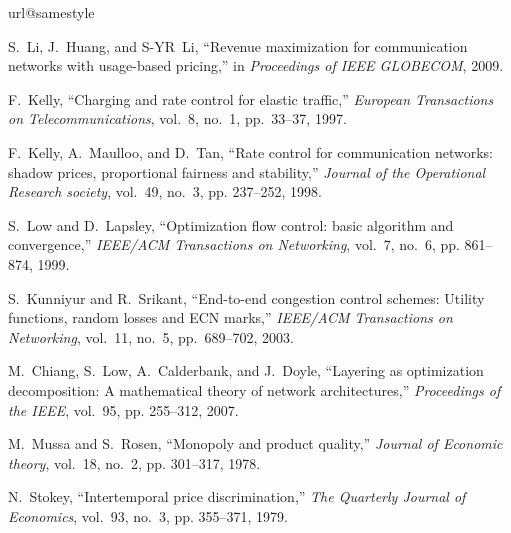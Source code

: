 \documentclass[twocolumn,10pt,twosided]{IEEEtran}
\begin{document}
\begin{thebibliography}{10}
\providecommand{\url}[1]{#1}
\csname url@samestyle\endcsname
\providecommand{\newblock}{\relax}
\providecommand{\bibinfo}[2]{#2}
\providecommand{\BIBentrySTDinterwordspacing}{\spaceskip=0pt\relax}
\providecommand{\BIBentryALTinterwordstretchfactor}{4}
\providecommand{\BIBentryALTinterwordspacing}{\spaceskip=\fontdimen2\font plus
\BIBentryALTinterwordstretchfactor\fontdimen3\font minus
  \fontdimen4\font\relax}
\providecommand{\BIBforeignlanguage}[2]{{\expandafter\ifx\csname l@#1\endcsname\relax
\typeout{** WARNING: IEEEtran.bst: No hyphenation pattern has been}\typeout{** loaded for the language `#1'. Using the pattern for}\typeout{** the default language instead.}\else
\language=\csname l@#1\endcsname
\fi
#2}}
\providecommand{\BIBdecl}{\relax}
\BIBdecl

S.~Li, J.~Huang, and S-YR~Li, 
``{Revenue maximization for communication networks with usage-based pricing},''
in \emph{Proceedings of  IEEE GLOBECOM}, 2009.

F.~Kelly, ``{Charging and rate control for elastic traffic},'' \emph{European
  Transactions on Telecommunications}, vol.~8, no.~1, pp.~33--37, 1997.

F.~Kelly, A.~Maulloo, and D.~Tan, ``{Rate control for communication networks:
  shadow prices, proportional fairness and stability},'' \emph{Journal of the
  Operational Research society}, vol.~49, no.~3, pp. 237--252, 1998.

S.~Low and D.~Lapsley, ``{Optimization flow control: basic algorithm and
  convergence},'' \emph{IEEE/ACM Transactions on Networking}, vol.~7,
  no.~6, pp. 861--874, 1999.

S.~Kunniyur and R.~Srikant, ``{End-to-end congestion control schemes: Utility
  functions, random losses and ECN marks},'' \emph{IEEE/ACM Transactions on
  Networking}, vol.~11, no.~5, pp.~689--702, 2003.

M.~Chiang, S.~Low, A.~Calderbank, and J.~Doyle, ``{Layering as optimization
  decomposition: A mathematical theory of network architectures},''
  \emph{Proceedings of the IEEE}, vol.~95, pp. 255--312, 2007.

M.~Mussa and S.~Rosen, ``{Monopoly and product quality},'' \emph{Journal of
  Economic theory}, vol.~18, no.~2, pp. 301--317, 1978.

N.~Stokey, ``{Intertemporal price discrimination},'' \emph{The Quarterly
  Journal of Economics}, vol.~93, no.~3, pp. 355--371, 1979.


\end{thebibliography}
\end{document}
